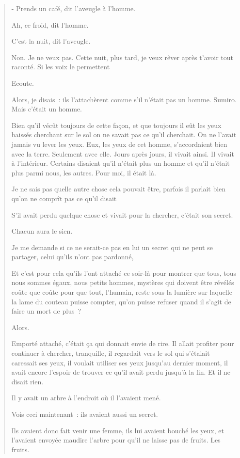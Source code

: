 \begin{quote}
- Prends un café, dit l'aveugle à l'homme.

Ah, ce froid, dit l'homme.

C'est la nuit, dit l'aveugle.

Non. Je ne veux pas. Cette nuit, plus tard, je veux rêver après t'avoir
tout raconté. Si les voix le permettent

Ecoute.

Alors, je disais~: ils l'attachèrent comme s'il n'était pas un homme.
Sumiro. Mais c'était un homme.

Bien qu'il vécût toujours de cette façon, et que toujours il eût les
yeux baissés cherchant sur le sol on ne savait pas ce qu'il cherchait.
On ne l'avait jamais vu lever les yeux. Eux, les yeux de cet homme,
s'accordaient bien avec la terre. Seulement avec elle. Jours après
jours, il vivait ainsi. Il vivait à l'intérieur. Certains disaient qu'il
n'était plus un homme et qu'il n'était plus parmi nous, les autres. Pour
moi, il était là.

Je ne sais pas quelle autre chose cela pouvait être, parfois il parlait
bien qu'on ne comprît pas ce qu'il disait

S'il avait perdu quelque chose et vivait pour la chercher, c'était son
secret.

Chacun aura le sien.

Je me demande si ce ne serait-ce pas en lui un secret qui ne peut se
partager, celui qu'ils n'ont pas pardonné,

Et c'est pour cela qu'ils l'ont attaché ce soir-là pour montrer que
tous, tous nous sommes égaux, nous petits hommes, mystères qui doivent
être révélés coûte que coûte pour que tout, l'humain, reste sous la
lumière sur laquelle la lame du couteau puisse compter, qu'on puisse
refuser quand il s'agit de faire un mort de plus~?

Alors.

Emporté attaché, c'était ça qui donnait envie de rire. Il allait
profiter pour continuer à chercher, tranquille, il regardait vers le sol
qui s'étalait caressait ses yeux, il voulait utiliser ses yeux jusqu'au
dernier moment, il avait encore l'espoir de trouver ce qu'il avait perdu
jusqu'à la fin. Et il ne disait rien.

Il y avait un arbre à l'endroit où il l'avaient mené.

Vois ceci maintenant~: ils avaient aussi un secret.

Ils avaient donc fait venir une femme, ils lui avaient bouché les yeux,
et l'avaient envoyée maudire l'arbre pour qu'il ne laisse pas de fruits.
Les fruits.


\end{quote}
